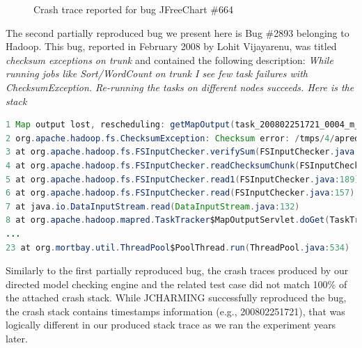 \documentclass[12pt]{report}
\begin{document}
\begin{figure}[]

\noindent{}

\caption{Crash trace reported for bug JFreeChart \#664\label{fig:jfree}}
\end{figure}

The second partially reproduced bug we present here is Bug \#2893
belonging to Hadoop. This bug, reported in February 2008 by Lohit
Vijayarenu, was titled \emph{checksum exceptions on trunk} and contained
the following description: \emph{While running jobs like Sort/WordCount
on trunk I see few task failures with ChecksumException. Re-running the
tasks on different nodes succeeds. Here is the stack}

\begin{lstlisting}[language=Java]
1 Map output lost, rescheduling: getMapOutput(task_200802251721_0004_m_000237_0,29) failed : 
2 org.apache.hadoop.fs.ChecksumException: Checksum error: /tmps/4/apred-tt/mapred-local/task_200802251721_0004_m_000237_0/file.out at 2085376 
3 at org.apache.hadoop.fs.FSInputChecker.verifySum(FSInputChecker.java:276) 
4 at org.apache.hadoop.fs.FSInputChecker.readChecksumChunk(FSInputChecker.java:238) 
5 at org.apache.hadoop.fs.FSInputChecker.read1(FSInputChecker.java:189) 
6 at org.apache.hadoop.fs.FSInputChecker.read(FSInputChecker.java:157) 
7 at java.io.DataInputStream.read(DataInputStream.java:132) 
8 at org.apache.hadoop.mapred.TaskTracker$MapOutputServlet.doGet(TaskTracker.java:2299) 
...
23 at org.mortbay.util.ThreadPool$PoolThread.run(ThreadPool.java:534)
\end{lstlisting}

Similarly to the first partially reproduced bug, the crash traces
produced by our directed model checking engine and the related test case
did not match 100\% of the attached crash stack. While JCHARMING
successfully reproduced the bug, the crash stack contains timestamps
information (e.g., 200802251721), that was logically different in our
produced stack trace as we ran the experiment years later.
\end{document}
